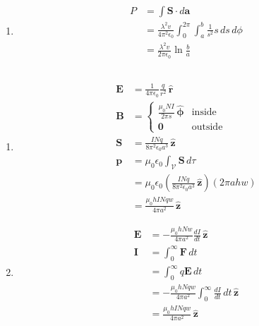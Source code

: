 \documentclass{article}
\renewcommand{\vec}[1]{\boldsymbol{\mathbf{#1}}}
\newcommand{\uvec}[1]{\hat{\vec{#1}}}
\newcommand{\ke}{\frac{1}{4 \pi \epsilon_0}}
\begin{document}
\begin{enumerate}
  \item

        \begin{align*}
          P & = \int \vec{S} \cdot d \vec{a}                                                                  \\
            & = \frac{\lambda^2 v}{4 \pi^2 \epsilon_0} \int_0^{2 \pi} \int_a^b \frac{1}{s^2} s \,d s \,d \phi \\
            & = \frac{\lambda^2 v}{2 \pi \epsilon_0} \ln \frac{b}{a}
        \end{align*}
\end{enumerate}

\subsection{}

\begin{enumerate}
  \item

        \begin{align*}
          \vec{E} & = \ke \frac{q}{r^2} \,\uvec{r}                                                                  \\
          \vec{B} & = \begin{cases}
                        \frac{\mu_0 N I}{2 \pi s} \,\uvec{\phi} & \text{inside}  \\
                        \vec{0}                                 & \text{outside}
                      \end{cases}                                      \\
          \vec{S} & = \frac{I N q}{8 \pi^2 \epsilon_0 a ^3} \,\uvec{z}                                              \\
          \vec{p} & = \mu_0 \epsilon_0 \int_\mathcal{V} \vec{S} \,d \tau                                            \\
                  & = \mu_0 \epsilon_0 \left( \frac{I N q}{8 \pi^2 \epsilon_0 a^3} \,\uvec{z} \right) (2 \pi a h w) \\
                  & = \frac{\mu_0 h I N q w}{4 \pi a^2} \,\uvec{z}
        \end{align*}

  \item

        \begin{align*}
          \vec{E} & = -\frac{\mu_0 h N w}{4 \pi a^2} \frac{d I}{d t} \,\uvec{z}                       \\
          \vec{I} & = \int_0^\infty \vec{F} \,d t                                                     \\
                  & = \int_0^\infty q \vec{E} \,d t                                                   \\
                  & = -\frac{\mu_0 h N q w}{4 \pi a^2} \int_0^\infty \frac{d I}{d t} \,d t \,\uvec{z} \\
                  & = \frac{\mu_0 h I N q w}{4 \pi a^2} \,\uvec{z}
        \end{align*}
\end{enumerate}
\end{document}

